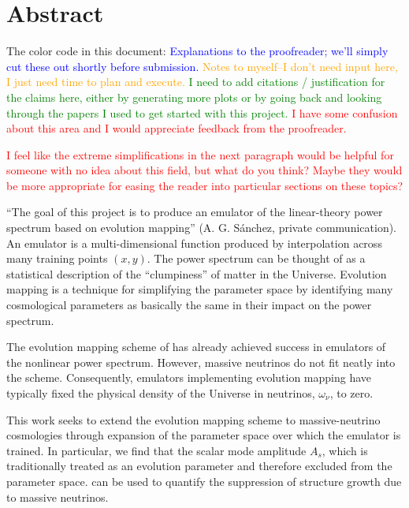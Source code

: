 

\chapter*{Abstract}

The color code in this document: \textcolor{blue}{Explanations to the
proofreader; we'll simply cut these out shortly before submission.}
\textcolor{orange}{Notes to myself--I don't need input here, I just need time
to plan and execute.} \textcolor{green}{I need to add citations / 
justification for the claims here, either by generating more plots or by going
back and looking through the papers I used to get started with this project.}
\textcolor{red}{I have some confusion about this area and I would appreciate
feedback from the proofreader.}

\textcolor{red}{I feel like the extreme simplifications in the next paragraph
would be helpful for someone with no idea about this field, but what do you
think? Maybe they would be more appropriate for easing the reader into
particular sections on these topics?}

``The goal of this project is to produce an emulator of the linear-theory
power spectrum based on evolution mapping'' (A. G. S\'{a}nchez, private
communication). An emulator is a multi-dimensional function
produced by interpolation across many training points $(x, y)$. The power
spectrum can be thought of as a statistical description of the ``clumpiness''
of matter in the Universe. Evolution mapping is a technique for simplifying
the parameter space by identifying many cosmological parameters as basically
the same in their impact on the power spectrum.

The evolution mapping scheme of  has already achieved success in
emulators of the nonlinear power spectrum. However, massive neutrinos do not
fit neatly into the scheme. Consequently, emulators implementing evolution
mapping have typically fixed the physical density of the Universe in 
neutrinos, $\omega_\nu$, to zero.

This work seeks to extend the evolution mapping scheme to massive-neutrino 
cosmologies through expansion of the parameter space over which the emulator
is trained. In particular, we find that the scalar mode amplitude $A_s$, which
is traditionally treated as an evolution parameter and therefore excluded from 
the parameter space. can be used to quantify the suppression of structure 
growth due to massive neutrinos.

